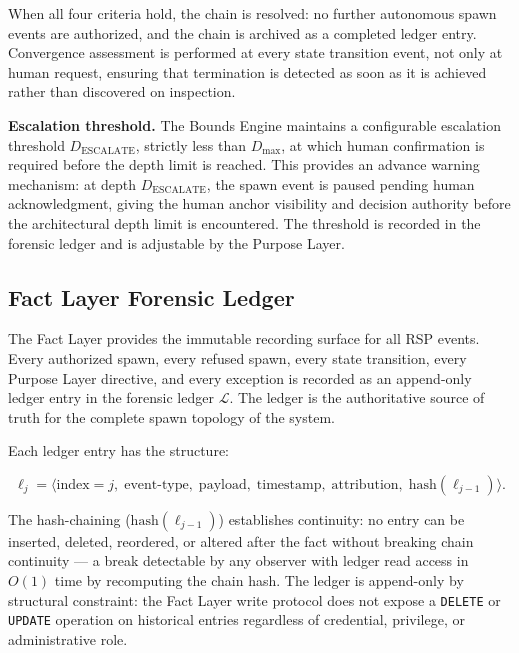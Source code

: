 When all four criteria hold, the chain is resolved: no further autonomous spawn events are authorized, and the chain is archived as a completed ledger entry. Convergence assessment is performed at every state transition event, not only at human request, ensuring that termination is detected as soon as it is achieved rather than discovered on inspection.

\medskip
\noindent\textbf{Escalation threshold.} The Bounds Engine maintains a configurable escalation threshold $D_{\text{ESCALATE}}$, strictly less than $D_{\max}$, at which human confirmation is required before the depth limit is reached. This provides an advance warning mechanism: at depth $D_{\text{ESCALATE}}$, the spawn event is paused pending human acknowledgment, giving the human anchor visibility and decision authority before the architectural depth limit is encountered. The threshold is recorded in the forensic ledger and is adjustable by the Purpose Layer.

\subsection{Fact Layer Forensic Ledger}
\label{sec:rs-fact-layer-ledger}

The Fact Layer provides the immutable recording surface for all RSP events. Every authorized spawn, every refused spawn, every state transition, every Purpose Layer directive, and every exception is recorded as an append-only ledger entry in the forensic ledger $\mathcal{L}$. The ledger is the authoritative source of truth for the complete spawn topology of the system.

Each ledger entry has the structure:

\begin{equation}
\ell_j = \bigl\langle
\text{index}=j,\;
\text{event-type},\;
\text{payload},\;
\text{timestamp},\;
\text{attribution},\;
\text{hash}(\ell_{j-1})
\bigr\rangle .
\label{eq:rs-ledger-entry}
\end{equation}

The hash-chaining ($\text{hash}(\ell_{j-1})$) establishes continuity: no entry can be inserted, deleted, reordered, or altered after the fact without breaking chain continuity — a break detectable by any observer with ledger read access in $O(1)$ time by recomputing the chain hash. The ledger is append-only by structural constraint: the Fact Layer write protocol does not expose a \texttt{DELETE} or \texttt{UPDATE} operation on historical entries regardless of credential, privilege, or administrative role.

